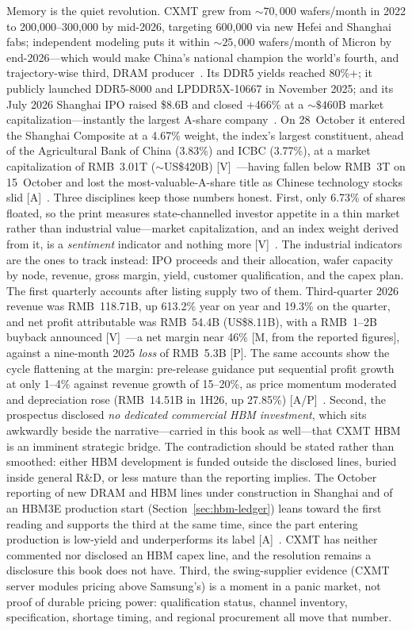 Memory is the quiet revolution. CXMT grew from ${\sim}70{,}000$ wafers/month in 2022 to 200,000--300,000 by mid-2026, targeting 600,000 via new Hefei and Shanghai fabs; independent modeling puts it within ${\sim}25{,}000$ wafers/month of Micron by end-2026---which would make China's national champion the world's fourth, and trajectory-wise third, DRAM producer~\cite{cxmt-capacity,citrini}. Its DDR5 yields reached 80\%+; it publicly launched DDR5-8000 and LPDDR5X-10667 in November 2025; and its July 2026 Shanghai IPO raised \$8.6B and closed +466\% at a ${\sim}\$460$B market capitalization---instantly the largest A-share company~\cite{cxmt-ddr5,cxmt-ipo,cxmt-reuters}. On 28~October it entered the Shanghai Composite at a 4.67\% weight, the index's largest constituent, ahead of the Agricultural Bank of China (3.83\%) and ICBC (3.77\%), at a market capitalization of RMB~3.01T (${\sim}$US\$420B) [V]~\cite{hw-cxmt-index}---having fallen below RMB~3T on 15~October and lost the most-valuable-A-share title as Chinese technology stocks slid [A]~\cite{hw-cn-chip-equities}. Three disciplines keep those numbers honest. First, only 6.73\% of shares floated, so the print measures state-channelled investor appetite in a thin market rather than industrial value---market capitalization, and an index weight derived from it, is a \emph{sentiment} indicator and nothing more [V]~\cite{cxmt-reuters}. The industrial indicators are the ones to track instead: IPO proceeds and their allocation, wafer capacity by node, revenue, gross margin, yield, customer qualification, and the capex plan. The first quarterly accounts after listing supply two of them. Third-quarter 2026 revenue was RMB~118.71B, up 613.2\% year on year and 19.3\% on the quarter, and net profit attributable was RMB~54.4B (US\$8.11B), with a RMB~1--2B buyback announced [V]~\cite{hw-cxmt-q3}---a net margin near 46\% [M, from the reported figures], against a nine-month 2025 \emph{loss} of RMB~5.3B [P]. The same accounts show the cycle flattening at the margin: pre-release guidance put sequential profit growth at only 1--4\% against revenue growth of 15--20\%, as price momentum moderated and depreciation rose (RMB~14.51B in 1H26, up 27.85\%) [A/P]~\cite{hw-cxmt-q3}. Second, the prospectus disclosed \emph{no dedicated commercial HBM investment}, which sits awkwardly beside the narrative---carried in this book as well---that CXMT HBM is an imminent strategic bridge. The contradiction should be stated rather than smoothed: either HBM development is funded outside the disclosed lines, buried inside general R\&D, or less mature than the reporting implies. The October reporting of new DRAM and HBM lines under construction in Shanghai and of an HBM3E production start (Section~\ref{sec:hbm-ledger}) leans toward the first reading and supports the third at the same time, since the part entering production is low-yield and underperforms its label [A]~\cite{hw-cxmt-hbm3e}. CXMT has neither commented nor disclosed an HBM capex line, and the resolution remains a disclosure this book does not have. Third, the swing-supplier evidence (CXMT server modules pricing above Samsung's) is a moment in a panic market, not proof of durable pricing power: qualification status, channel inventory, specification, shortage timing, and regional procurement all move that number.

